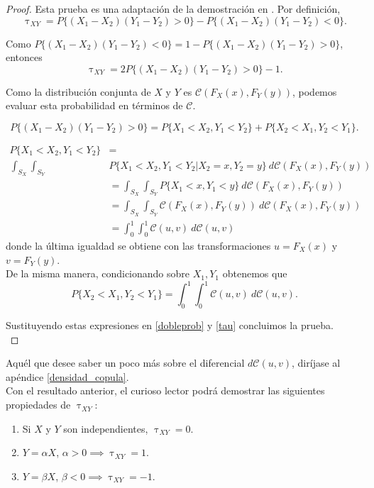 \documentclass[11pt,a4paper]{article}
\newcommand{\C}{\mathcal{C}}
\begin{document}
\begin{proof} Esta prueba es una adaptación de la demostración en \citet{nelsen}.
Por definición, $$\uptau_{XY} = P\{(X_1-X_2)(Y_1-Y_2) > 0\} - P\{(X_1-X_2)(Y_1-Y_2) < 0\}.$$

Como $P\{(X_1-X_2)(Y_1-Y_2) < 0\} = 1-P\{(X_1-X_2)(Y_1-Y_2) > 0\}$, entonces
\begin{equation} \label{tau}
\uptau_{XY} = 2P\{(X_1-X_2)(Y_1-Y_2) > 0\} - 1.
\end{equation}

Como la distribución conjunta de $X$ y $Y$ es $\C(F_X(x), F_Y(y))$, podemos evaluar esta probabilidad en términos de $\C$.

\begin{equation} \label{dobleprob}
P\{(X_1-X_2)(Y_1-Y_2) > 0\} = P\{X_1<X_2, Y_1<Y_2\} + P\{X_2<X_1, Y_2<Y_1\}.
\end{equation}

\begin{align*}
P\{X_1 < X_2, Y_1 < Y_2\} &=\\
\int_{S_X} \int_{S_Y} &P\{X_1 < X_2, Y_1 < Y_2 | X_2 = x, Y_2 = y\} \ d\C(F_X(x), F_Y(y))\\
&= \int_{S_X} \int_{S_Y} P\{X_1 < x, Y_1 < y\} \ d\C(F_X(x), F_Y(y))\\
&= \int_{S_X} \int_{S_Y} \C(F_X(x), F_Y(y)) \ d\C(F_X(x), F_Y(y))\\
&= \int_0^1 \int_0^1 \C(u, v) \ d\C(u, v)
\end{align*}
donde la última igualdad se obtiene con las transformaciones $u = F_X(x)$ y $v = F_Y(y)$.\\

De la misma manera, condicionando sobre $X_1, Y_1$ obtenemos que $$P\{X_2 < X_1, Y_2 < Y_1\} = \int_0^1 \int_0^1 \C(u, v) \ d\C(u, v).$$

Sustituyendo estas expresiones en \eqref{dobleprob} y \eqref{tau} concluimos la prueba.\\
\end{proof}

Aquél que desee saber un poco más sobre el diferencial $d\C(u, v)$, diríjase al apéndice \ref{densidad_copula}.\\

Con el resultado anterior, el curioso lector podrá demostrar las siguientes propiedades de $\uptau_{XY}$:

\begin{enumerate}
\item Si $X$ y $Y$ son independientes, $\uptau_{XY} = 0$.
\item $Y = \alpha X$, $\alpha > 0 \implies \uptau_{XY} = 1$.
\item $Y = \beta X$, $\beta < 0 \implies \uptau_{XY} = -1$.
\end{enumerate}
\end{document}
